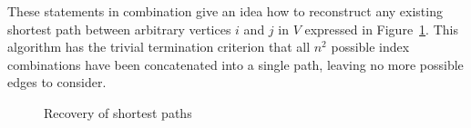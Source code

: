 These statements in combination give an idea how to reconstruct any existing shortest path between arbitrary vertices $i$ and $j$ in $V$ expressed in Figure~\ref{alg:recovery}.
This algorithm has the trivial termination criterion that all $n^2$ possible index combinations have been concatenated into a single path, leaving no more possible edges to consider.

\begin{figure}[ht]
    \centering
    \begin{minipage}{.9\textwidth}
        \begin{algorithm}[H]
        \end{algorithm}
    \end{minipage}
    \caption{Recovery of shortest paths}\label{alg:recovery}
\end{figure}
